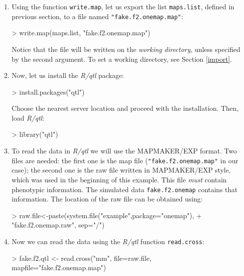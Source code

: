 \documentclass[letterpaper,12pt,oneside]{article}
\begin{document}
\begin{enumerate}

\item  Using the function {\tt write.map}, let us export the list {\tt maps.list}, defined in previous section, to a file named {\tt "fake.f2.onemap.map"}:

\begin{Schunk}
\begin{Sinput}
> write.map(maps.list, "fake.f2.onemap.map")
\end{Sinput}
\end{Schunk}

Notice that the file will be written on the {\it working directory}, unless specified by the second argument. To set a working directory, see Section \ref{import}. 

\item Now, let us install the {\sl R/qtl} package:

\begin{Schunk}
\begin{Sinput}
> install.packages("qtl")
\end{Sinput}
\end{Schunk}

Choose the nearest server location and proceed with the installation. Then, load {\sl R/qtl}:

\begin{Schunk}
\begin{Sinput}
> library("qtl")
\end{Sinput}
\end{Schunk}

\item To read the data in {\sl R/qtl} we will use the MAPMAKER/EXP format. Two files are needed: the first one is the map file ({\tt "fake.f2.onemap.map"} in our case); the second one is the raw file written  in MAPMAKER/EXP style, which was used in the beginning of this example. This file {\it must} contain phenotypic information. The simulated data {\tt fake.f2.onemap} contains that information. The location of the raw file can be obtained using:

\begin{Schunk}
\begin{Sinput}
> raw.file<-paste(system.file("example",package="onemap"),
+                 "fake.f2.onemap.raw", sep="/")
\end{Sinput}
\end{Schunk}

\item Now we can read the data using the {\sl R/qtl} function {\tt read.cross}:
\begin{Schunk}
\begin{Sinput}
> fake.f2.qtl <- read.cross("mm", file=raw.file, mapfile="fake.f2.onemap.map")
\end{Sinput}
\end{Schunk}


\end{enumerate}
\end{document}
